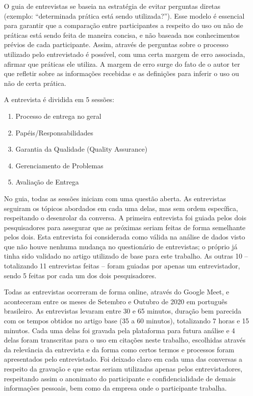O guia de entrevistas se baseia na estratégia de evitar perguntas diretas (exemplo: “determinada prática está sendo utilizada?”). Esse modelo é essencial para garantir que a comparação entre participantes a respeito do uso ou não de práticas está sendo feita de maneira concisa, e não baseada nos conhecimentos prévios de cada participante. Assim, através de perguntas sobre o processo utilizado pelo entrevistado é possível, com uma certa margem de erro associada, afirmar que práticas ele utiliza. A margem de erro surge do fato de o autor ter que refletir sobre as informações recebidas e as definições para inferir o uso ou não de certa prática.

A entrevista é dividida em 5 sessões: 

\begin{enumerate}
\item Processo de entrega no geral
\item Papéis/Responsabilidades
\item Garantia da Qualidade (Quality Assurance)
\item Gerenciamento de Problemas
\item Avaliação de Entrega
\end{enumerate}

No guia, todas as sessões iniciam com uma questão aberta. As entrevistas seguiram os tópicos abordados em cada uma delas, mas sem ordem específica, respeitando o desenrolar da conversa. A primeira entrevista foi guiada pelos dois pesquisadores para assegurar que as próximas seriam feitas de forma semelhante pelos dois. Esta entrevista foi considerada como válida na análise de dados visto que não houve nenhuma mudança no questionário de entrevistas; o próprio já tinha sido validado no artigo utilizado de base para este trabalho. As outras 10 -- totalizando 11 entrevistas feitas -- foram guiadas por apenas um entrevistador, sendo 5 feitas por cada um dos dois pesquisadores.

Todas as entrevistas ocorreram de forma online, através do Google Meet, e aconteceram entre os meses de Setembro e Outubro de 2020 em português brasileiro. As entrevistas levaram entre 30 e 65 minutos, duração bem parecida com os tempos obtidos no artigo base (35 a 60 minutos), totalizando 7 horas e 15 minutos. Cada uma delas foi gravada pela plataforma para futura análise e 4 delas foram transcritas para o uso em citações neste trabalho, escolhidas através da relevância da entrevista e da forma como certos termos e processos foram apresentados pelo entrevistado. Foi deixado claro em cada uma das conversas a respeito da gravação e que estas seriam utilizadas apenas pelos entrevistadores, respeitando assim o anonimato do participante e confidencialidade de demais informações pessoais, bem como da empresa onde o participante trabalha.

